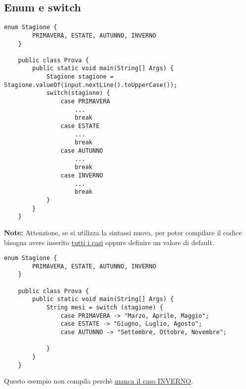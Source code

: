 \documentclass[../main.tex]{subfiles}
\begin{document}
\pagebreak
\subsection{Enum e switch}
\begin{lstlisting}[style=java]
    enum Stagione {
        PRIMAVERA, ESTATE, AUTUNNO, INVERNO
    }

    public class Prova {
        public static void main(String[] Args) {
            Stagione stagione = Stagione.valueOf(input.nextLine().toUpperCase());
            switch(stagione) {
                case PRIMAVERA
                    ...
                    break
                case ESTATE
                    ...
                    break
                case AUTUNNO
                    ...
                    break
                case INVERNO
                    ...
                    break
            }
        }
    }
\end{lstlisting}

\vspace{0.75cm}
\textbf{Note:} Attenzione, se si utilizza la sintassi nuova, per poter compilare il codice bisogna avere inserito \underline{tutti i casi}
oppure definire un valore di default.
\begin{lstlisting}[style=java]
    enum Stagione {
        PRIMAVERA, ESTATE, AUTUNNO, INVERNO
    }

    public class Prova {
        public static void main(String[] Args) {
            String mesi = switch (stagione) {
                case PRIMAVERA -> "Marzo, Aprile, Maggio";
                case ESTATE -> "Giugno, Luglio, Agosto";
                case AUTUNNO -> "Settembre, Ottobre, Novembre";

            }
        }
    }
\end{lstlisting}
Questo esempio non compila perchè \underline{manca il caso INVERNO}.
\end{document}
